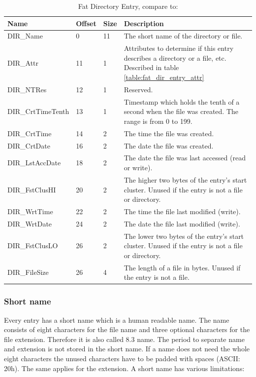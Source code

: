\begin{table}[!ht]
\caption{Fat Directory Entry, compare to: \cite{usb_ms_jan, fatgen103}}
\centering
\begin{tabular}{|l|l|l|p{8.5cm}|}
\hline\hline
\textbf{Name} & \textbf{Offset} & \textbf{Size} & \textbf{Description}\\ \hline
DIR\_Name & 0 & 11 & The short name of the directory or file. \\ \hline
DIR\_Attr & 11 & 1 & Attributes to determine if this entry describes a directory or a file, etc. Described in table \ref{table:fat_dir_entry_attr} \\ \hline
DIR\_NTRes & 12 & 1 & Reserved. \\ \hline
DIR\_CrtTimeTenth & 13 & 1 & Timestamp which holds the tenth of a second when the file was created. The range is from 0 to 199. \\ \hline
DIR\_CrtTime & 14 & 2 & The time the file was created. \\ \hline
DIR\_CrtDate & 16 & 2 & The date the file was created. \\ \hline
DIR\_LstAccDate & 18 & 2 & The date the file was last accessed (read or write). \\ \hline
DIR\_FstClusHI & 20 & 2 & The higher two bytes of the entry's start cluster. Unused if the entry is not a file or directory. \\ \hline
DIR\_WrtTime & 22 & 2 & The time the file last modified (write). \\ \hline
DIR\_WrtDate & 24 & 2 & The date the file last modified (write). \\ \hline
DIR\_FstClusLO & 26 & 2 & The lower two bytes of the entry's start cluster. Unused if the entry is not a file or directory. \\ \hline
DIR\_FileSize & 26 & 4 & The length of a file in bytes. Unused if the entry is not a file. \\ \hline
\end{tabular}
\label{table:fat_dir_entry}
\end{table}

\subsubsection{Short name}

Every entry has a short name which is a human readable name. The name consists of eight characters for the file name and three optional characters for the file extension. Therefore it is also called 8.3 name. The period to separate name and extension is not stored in the short name. If a name does not need the whole eight characters the unused characters have to be padded with spaces (ASCII: 20h). The same applies for the extension. A short name has various limitations\cite{usb_ms_jan}:


